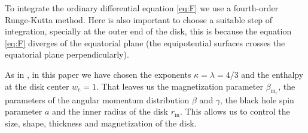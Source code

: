 \documentclass{aa}
\begin{document}
To integrate the ordinary differential equation \eqref{eq:F} we use a fourth-order Runge-Kutta method. Here is also important to choose a suitable step of integration, specially at the outer end of the disk, this is because the equation \eqref{eq:F} diverges of the equatorial plane (the equipotential surfaces crosses the equatorial plane perpendicularly).


As in \citet{Komissarov:2006}, in this paper we have chosen the exponents $\kappa = \lambda
 = 4/3$ and the enthalpy at the disk center $w_{\mathrm{c}} = 1$. That leaves us the magnetization parameter $\beta_{\mathrm{m}_{\mathrm{c}}}
$, the parameters of the angular momentum distribution $\beta$ and $\gamma$, the black hole spin parameter $a$ and the inner radius of the disk $r_{\mathrm{in}}$. This allows us to control the size, shape, thickness and magnetization of the disk.
\end{document}
